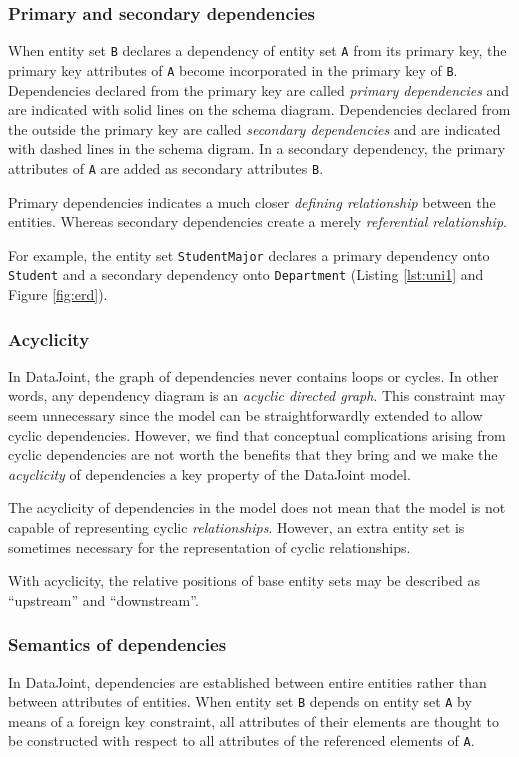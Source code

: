 \documentclass[letter,10pt]{article}
\newcommand{\datajoint}{DataJoint\xspace}
\begin{document}
\subsubsection{Primary and secondary dependencies}
When entity set \lstinline$B$ declares a dependency of entity set \lstinline$A$ from its primary key, the primary key attributes of \lstinline$A$ become incorporated in the primary key of \lstinline$B$.  
Dependencies declared from the primary key are called \emph{primary dependencies} and are indicated with solid lines on the schema diagram. 
Dependencies declared from the outside the primary key are called \emph{secondary dependencies} and are indicated with dashed lines in the schema digram.  
In a secondary dependency, the primary attributes of \lstinline$A$ are added as secondary attributes \lstinline$B$. 

Primary dependencies indicates a much closer \emph{defining relationship} between the entities. Whereas secondary dependencies create a merely \emph{referential relationship}.

For example, the entity set \lstinline$StudentMajor$ declares a primary dependency onto \lstinline$Student$ and a secondary dependency onto \lstinline$Department$ (Listing \ref{lst:uni1} and Figure \ref{fig:erd}).

\subsubsection{Acyclicity}
In \datajoint, the graph of dependencies never contains loops or cycles.  
In other words, any dependency diagram is an \emph{acyclic directed graph}.
This constraint may seem unnecessary since the model can be straightforwardly extended to allow cyclic dependencies. 
However, we find that conceptual complications arising from cyclic dependencies are not worth the benefits that they bring and we make the \emph{acyclicity} of dependencies a key property of the \datajoint model.

The acyclicity of dependencies in the model does not mean that the model is not capable of representing cyclic \emph{relationships}. 
However, an extra entity set is sometimes necessary for the representation of cyclic relationships. 

With acyclicity, the relative positions of base entity sets may be described as ``upstream'' and ``downstream''.

\subsubsection{Semantics of dependencies}\label{sec:semantics}
In \datajoint, dependencies are established between entire entities rather than between attributes of entities.  
When entity set \lstinline$B$ depends on entity set \lstinline$A$ by means of a foreign key constraint, all attributes of their elements are thought to be constructed with respect to all attributes of the referenced elements of \lstinline$A$.
\end{document}
